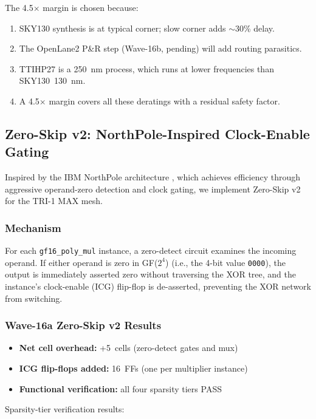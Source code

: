 The 4.5\(\times\) margin is chosen because:
\begin{enumerate}
  \item SKY130 synthesis is at typical corner; slow corner adds $\sim$30\% delay.
  \item The OpenLane2 P\&R step (Wave-16b, pending) will add routing parasitics.
  \item TTIHP27 is a 250~nm process, which runs at lower frequencies than SKY130~130~nm.
  \item A 4.5\(\times\) margin covers all these deratings with a residual safety factor.
\end{enumerate}

\subsection{Zero-Skip v2: NorthPole-Inspired Clock-Enable Gating}

Inspired by the IBM NorthPole architecture \cite{modha_northpole_2023},
which achieves efficiency through aggressive operand-zero detection and
clock gating, we implement Zero-Skip v2 for the TRI-1 MAX mesh.

\subsubsection{Mechanism}

For each \texttt{gf16\_poly\_mul} instance, a zero-detect circuit
examines the incoming operand.
If either operand is zero in GF(\(2^4\)) (i.e., the 4-bit value
\texttt{0000}), the output is immediately asserted zero without
traversing the XOR tree, and the instance's clock-enable (ICG) flip-flop
is de-asserted, preventing the XOR network from switching.

\subsubsection{Wave-16a Zero-Skip v2 Results}

\begin{itemize}
  \item \textbf{Net cell overhead:} +5~cells (zero-detect gates and mux)
  \item \textbf{ICG flip-flops added:} 16~FFs (one per multiplier instance)
  \item \textbf{Functional verification:} all four sparsity tiers PASS
\end{itemize}

Sparsity-tier verification results:

